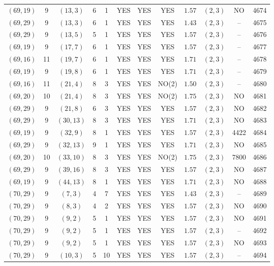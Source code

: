 \begin{longtable}{|c|c|c|c|c|c|c|c|c|c|c|c|}
$(69,19)$ & 9 & $(13,3)$ & 6 & 1 & YES & YES & YES & $1.57$ & $(2,3)$ & NO & 4674\\
$(69,29)$ & 9 & $(13,3)$ & 6 & 1 & YES & YES & YES & $1.43$ & $(2,3)$ & -- & 4675\\
$(69,29)$ & 9 & $(13,5)$ & 5 & 1 & YES & YES & YES & $1.57$ & $(2,3)$ & -- & 4676\\
$(69,19)$ & 9 & $(17,7)$ & 6 & 1 & YES & YES & YES & $1.57$ & $(2,3)$ & -- & 4677\\
$(69,16)$ & 11 & $(19,7)$ & 6 & 1 & YES & YES & YES & $1.71$ & $(2,3)$ & -- & 4678\\
$(69,19)$ & 9 & $(19,8)$ & 6 & 1 & YES & YES & YES & $1.71$ & $(2,3)$ & -- & 4679\\
$(69,16)$ & 11 & $(21,4)$ & 8 & 3 & YES & YES & NO(2) & $1.50$ & $(2,3)$ & -- & 4680\\
$(69,20)$ & 10 & $(21,4)$ & 8 & 3 & YES & YES & NO(2) & $1.75$ & $(2,3)$ & NO & 4681\\
$(69,29)$ & 9 & $(21,8)$ & 6 & 3 & YES & YES & YES & $1.57$ & $(2,3)$ & NO & 4682\\
$(69,29)$ & 9 & $(30,13)$ & 8 & 3 & YES & YES & YES & $1.71$ & $(2,3)$ & NO & 4683\\
$(69,19)$ & 9 & $(32,9)$ & 8 & 1 & YES & YES & YES & $1.57$ & $(2,3)$ & 4422 & 4684\\
$(69,29)$ & 9 & $(32,13)$ & 9 & 1 & YES & YES & YES & $1.71$ & $(2,3)$ & NO & 4685\\
$(69,20)$ & 10 & $(33,10)$ & 8 & 3 & YES & YES & NO(2) & $1.75$ & $(2,3)$ & 7800 & 4686\\
$(69,29)$ & 9 & $(39,16)$ & 8 & 3 & YES & YES & YES & $1.57$ & $(2,3)$ & NO & 4687\\
$(69,19)$ & 9 & $(44,13)$ & 8 & 1 & YES & YES & YES & $1.71$ & $(2,3)$ & NO & 4688\\
$(70,29)$ & 9 & $(7,3)$ & 4 & 7 & YES & YES & YES & $1.43$ & $(2,3)$ & -- & 4689\\
$(70,29)$ & 9 & $(8,3)$ & 4 & 2 & YES & YES & YES & $1.57$ & $(2,3)$ & NO & 4690\\
$(70,29)$ & 9 & $(9,2)$ & 5 & 1 & YES & YES & YES & $1.57$ & $(2,3)$ & NO & 4691\\
$(70,29)$ & 9 & $(9,2)$ & 5 & 1 & YES & YES & YES & $1.57$ & $(2,3)$ & -- & 4692\\
$(70,29)$ & 9 & $(9,2)$ & 5 & 1 & YES & YES & YES & $1.57$ & $(2,3)$ & NO & 4693\\
$(70,29)$ & 9 & $(10,3)$ & 5 & 10 & YES & YES & YES & $1.57$ & $(2,3)$ & -- & 4694\\

\end{longtable}
